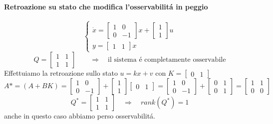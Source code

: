 \documentclass[../main.tex]{subfiles}
\begin{document}
		\begin{mdframed}[style=Esempio]
			\paragraph{Retroazione su stato che modifica l'osservabilit\'a in peggio}
			\[
				\begin{cases}
					\dot x =
					\begin{bmatrix}
						1 & 0\\
						0 & -1
					\end{bmatrix} x +
					\begin{bmatrix}
						1\\
						1
					\end{bmatrix} u
					\\[1em]
					y =
					\begin{bmatrix}
						1 & 1
					\end{bmatrix} x
				\end{cases}
			\]
			\[
				Q =
				\begin{bmatrix}
					1 & 1\\
					1 & 1
				\end{bmatrix}
				\qquad\Rightarrow\quad\text{il sistema \'e completamente osservabile}
			\]
			Effettuiamo la retroazione sullo stato $ u = kx + v $ con $ K = \begin{bmatrix} 0 & 1 \end{bmatrix} $
			\[
				A* = (A+BK) =
				\begin{bmatrix}
					1 & 0\\
					0 & -1
				\end{bmatrix} +
				\begin{bmatrix}
					1\\
					1
				\end{bmatrix}
				\begin{bmatrix}
					0 & 1
				\end{bmatrix} =
				\begin{bmatrix}
					1 & 0\\
					0 & -1
				\end{bmatrix} +
				\begin{bmatrix}
					0 & 1\\
					0 & 1
				\end{bmatrix} =
				\begin{bmatrix}
					1 & 1\\
					0 & 0
				\end{bmatrix}
			\]
			\[
				Q^{*} =
				\begin{bmatrix}
					1 & 1\\
					1 & 1
				\end{bmatrix}
				\quad\Rightarrow\quad rank(Q^{*}) = 1 
			\]
			anche in questo caso abbiamo perso osservabilit\'a.
		\end{mdframed}
		
\end{document}
